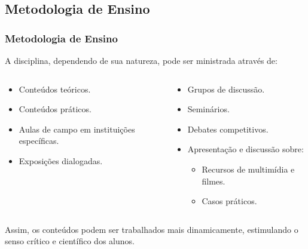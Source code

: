 \subsection[Metodologia de Ensino]{Metodologia de Ensino}\label{subsec:plano-ensino-metodologia}



\begin{frame}[t]\frametitle{Metodologia de Ensino}

  \justifying{}
  A disciplina, dependendo de sua natureza, pode ser ministrada através de:

  \begin{columns}[onlytextwidth,T]

    \begin{column}{0.48\linewidth}
      \begin{itemize}
        \justifying{}
        \setlength\itemsep{1em}
        \item Conteúdos teóricos.
        \item Conteúdos práticos.
        \item Aulas de campo em instituições específicas.
        \item Exposições dialogadas.
      \end{itemize}
    \end{column}

    \begin{column}{0.48\linewidth}
      \begin{itemize}
        \justifying{}
        \setlength\itemsep{1em}
        \item Grupos de discussão.
        \item Seminários.
        \item Debates competitivos.
        \item Apresentação e discussão sobre:
        \begin{itemize}
          \justifying{}
          \item Recursos de multimídia e filmes.
          \item Casos práticos.
        \end{itemize}
      \end{itemize}
    \end{column}

  \end{columns}

  \vspace*{\fill}

  Assim, os conteúdos podem ser trabalhados mais dinamicamente, estimulando o senso crítico e científico dos alunos.

\end{frame}



